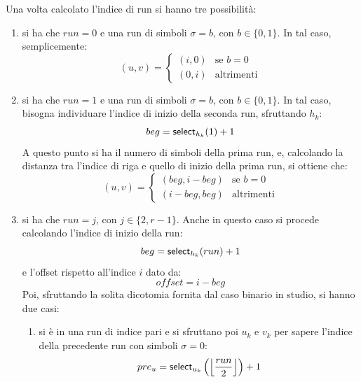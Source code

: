 Una volta calcolato l'indice di run si hanno tre possibilità:
\begin{enumerate}
  \item si ha che $run=0$ e una run di simboli $\sigma=b$, con $b\in\{0,1\}$. 
  In tal caso, semplicemente:
  \begin{equation}
    \label{eq:bv8}
    (u,v)=
    \begin{cases}
      (i,0)&\mbox{se } b=0\\
      (0,i)&\mbox{altrimenti}
    \end{cases}
  \end{equation}
  \item si ha che $run=1$ e una run di simboli $\sigma=b$, con $b\in\{0,1\}$. In
  tal caso, bisogna individuare l'indice di inizio della seconda
  run, sfruttando $h_k$:
  \begin{equation}
    \label{eq:bv9}
    beg = \mbox{\rm {\sf select}}_{h_k}(1)+1
  \end{equation}
  A questo punto si ha il numero di simboli della prima run, e,
  calcolando la distanza tra l'indice di riga e quello di inizio della prima
  run, si ottiene che:
  \begin{equation}
    \label{eq:bv10}
    (u,v)=
    \begin{cases}
      (beg,i-beg)&\mbox{se } b=0\\
      (i-beg,beg)&\mbox{altrimenti}
    \end{cases}
  \end{equation}
  \item si ha che $run=j$, con $j\in\{2,r-1\}$. Anche in questo caso si procede
  calcolando l'indice di inizio della run:
  \begin{equation}
    \label{eq:bv11}
    beg = \mbox{\rm {\sf select}}_{h_k}(run)+1
  \end{equation}
  e l'offset rispetto all'indice $i$ dato da:
  \begin{equation}
    \label{eq:bv12}
    offset = i-beg
  \end{equation}
  Poi, sfruttando la solita dicotomia fornita dal caso binario in studio, si
  hanno due casi: 
  \begin{enumerate}
    \item si è in una run di indice pari e si sfruttano poi $u_k$ e $v_k$ per
    sapere l'indice della precedente run con 
    simboli $\sigma=0$:
    \begin{equation}
      \label{eq:bv13}
      pre_u=\mbox{\rm {\sf select}}_{u_k}\left(\left\lfloor\frac{run}{2}\right\rfloor\right)+1
    \end{equation}

\end{enumerate}
\end{enumerate}
